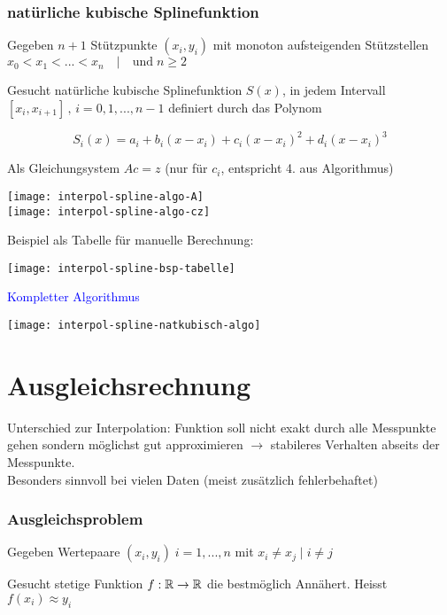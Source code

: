 \subsubsection{natürliche kubische Splinefunktion}
Gegeben $n+1$ Stützpunkte $(x_i, y_i)$ mit monoton aufsteigenden
Stützstellen $x_0 < x_1 < ... < x_n \quad | \quad \mathrm{und}\; n \ge 2$

Gesucht natürliche kubische Splinefunktion $S(x)$,
in jedem Intervall $[x_i, x_{i+1}]\, ,\,i=0,1,...,n-1$ definiert durch das Polynom

	{\large
		$$S_i(x) = a_i + b_i(x-x_i) + c_i(x-x_i)^2 + d_i(x-x_i)^3$$
	}

Als Gleichungsystem $Ac = z$ (nur für $c_i$, entspricht 4. aus Algorithmus)

\texttt{[image: interpol-spline-algo-A]}\\
\texttt{[image: interpol-spline-algo-cz]}


\begin{minipage}{0.4\linewidth}
	Beispiel als Tabelle für manuelle Berechnung:
\end{minipage}
\hfill
\begin{minipage}{0.5\linewidth}
	\texttt{[image: interpol-spline-bsp-tabelle]}
\end{minipage}

\textcolor{blue}{\Large Kompletter Algorithmus}

\texttt{[image: interpol-spline-natkubisch-algo]}




\section{Ausgleichsrechnung}
Unterschied zur Interpolation: Funktion soll nicht exakt durch alle Messpunkte
gehen sondern möglichst gut approximieren $\rightarrow$ stabileres Verhalten
abseits der Messpunkte.\\
Besonders sinnvoll bei vielen Daten (meist zusätzlich fehlerbehaftet)

\subsubsection{Ausgleichsproblem}

Gegeben Wertepaare $(x_i, y_i) \; i = 1,...,n$ mit $x_i \ne x_j \; | \; i \ne j$

Gesucht stetige Funktion $f: \mathbb{R} \to \mathbb{R}$ die bestmöglich Annähert. Heisst
$f(x_i) \approx y_i$


